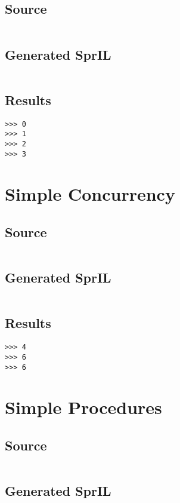 \documentclass[twoside]{report}
\begin{document}
\subsection{Source}
\inputminted[tabsize=4,linenos,firstnumber=1]{text}{../test/recursion.shl}
\subsection{Generated SprIL}
\inputminted[tabsize=4,linenos,firstnumber=0]{text}{../test/recursion_gen.txt}
\subsection{Results}
\begin{verbatim}
>>> 0
>>> 1
>>> 2
>>> 3
\end{verbatim}

\section{Simple Concurrency}
\subsection{Source}
\inputminted[tabsize=4,linenos,firstnumber=1]{text}{../test/simple_concurrency.shl}
\subsection{Generated SprIL}
\inputminted[tabsize=4,linenos,firstnumber=0]{text}{../test/simple_concurrency_gen.txt}
\subsection{Results}
\begin{verbatim}
>>> 4
>>> 6
>>> 6
\end{verbatim}

\section{Simple Procedures}
\subsection{Source}
\inputminted[tabsize=4,linenos,firstnumber=1]{text}{../test/simple_proc.shl}
\subsection{Generated SprIL}
\inputminted[tabsize=4,linenos,firstnumber=0]{text}{../test/simple_proc_gen.txt}
\end{document}
